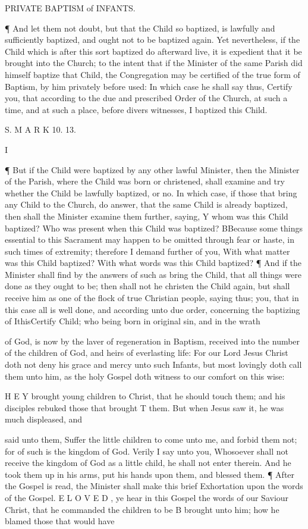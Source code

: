 PRIVATE BAPTISM of INFANTS.

¶ And let them not doubt, but that the Child so baptized, is lawfully and sufficiently baptized, and ought not to be baptized again. Yet nevertheless, if the Child which is after this sort baptized do afterward live, it is expedient that it be brought into the Church; to the intent that if the Minister of the same Parish did himself baptize that Child, the Congregation may be certified of the true form of Baptism, by him privately before used: In which case he shall say thus, Certify you, that according to the due and prescribed Order of the Church, at such a time, and at such a place, before divers witnesses, I baptized this Child.

S. M A R K 10. 13.

I

¶ But if the Child were baptized by any other lawful Minister, then the Minister of the Parish, where the Child was born or christened, shall examine and try whether the Child be lawfully baptized, or no. In which case, if those that bring any Child to the Church, do answer, that the same Child is already baptized, then shall the Minister examine them further, saying, Y whom was this Child baptized? Who was present when this Child was baptized? BBecause some things essential to this Sacrament may happen to be omitted through fear or haste, in such times of extremity; therefore I demand further of you, With what matter was this Child baptized? With what words was this Child baptized? ¶ And if the Minister shall find by the answers of such as bring the Child, that all things were done as they ought to be; then shall not he christen the Child again, but shall receive him as one of the flock of true Christian people, saying thus; you, that in this case all is well done, and according unto due order, concerning the baptizing of IthisCertify Child; who being born in original sin, and in the wrath

of God, is now by the laver of regeneration in Baptism, received into the number of the children of God, and heirs of everlasting life: For our Lord Jesus Christ doth not deny his grace and mercy unto such Infants, but most lovingly doth call them unto him, as the holy Gospel doth witness to our comfort on this wise:

H E Y brought young children to Christ, that he should touch them; and his disciples rebuked those that brought T them. But when Jesus saw it, he was much displeased, and

said unto them, Suffer the little children to come unto me, and forbid them not; for of such is the kingdom of God. Verily I say unto you, Whosoever shall not receive the kingdom of God as a little child, he shall not enter therein. And he took them up in his arms, put his hands upon them, and blessed them. ¶ After the Gospel is read, the Minister shall make this brief Exhortation upon the words of the Gospel. E L O V E D , ye hear in this Gospel the words of our Saviour Christ, that he commanded the children to be B brought unto him; how he blamed those that would have

